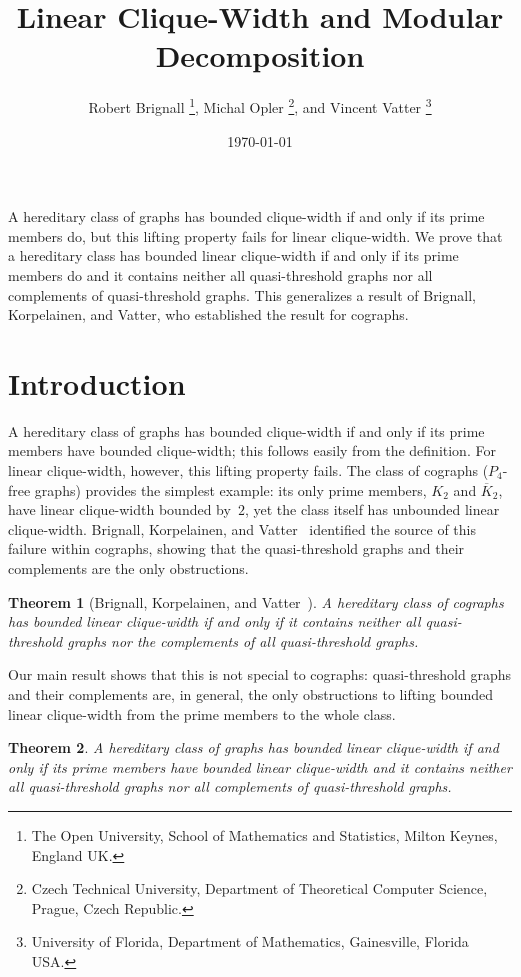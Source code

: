 \documentclass[10pt]{article}
\title{\sc Linear Clique-Width and Modular Decomposition}
\author{
  Robert Brignall%
  \footnote{The Open University, School of Mathematics and Statistics, Milton Keynes, England UK.},
  \quad
  Michal Opler%
  \footnote{Czech Technical University, Department of Theoretical Computer Science, Prague, Czech Republic.},
  \quad
  and
  \quad
  Vincent Vatter%
  \footnote{University of Florida, Department of Mathematics, Gainesville, Florida USA.}
}
\date{\today}
\theoremstyle{plain}
\newtheorem{theorem}{Theorem}[section]
\renewenvironment{abstract}
  {
    \begin{list}{}%
      {\setlength{\rightmargin}{1in}%
       \setlength{\leftmargin}{1in}}%
    \item[]\ignorespaces\begin{small}
  }
  {
    \end{small}\unskip\end{list}
  }
\begin{document}
\maketitle

\begin{abstract}
A hereditary class of graphs has bounded clique-width if and only if its prime members do, but this lifting property fails for linear clique-width. We prove that a hereditary class has bounded linear clique-width if and only if its prime members do and it contains neither all quasi-threshold graphs nor all complements of quasi-threshold graphs. This generalizes a result of Brignall, Korpelainen, and Vatter, who established the result for cographs.
\end{abstract}

\pagestyle{main}

%
%
%
%
%

\section{Introduction}

A hereditary class of graphs has bounded clique-width if and only if its prime members have bounded clique-width; this follows easily from the definition. For linear clique-width, however, this lifting property fails. The class of cographs ($P_4$-free graphs) provides the simplest example: its only prime members, $K_2$ and $\overline{K}_2$, have linear clique-width bounded by~$2$, yet the class itself has unbounded linear clique-width. Brignall, Korpelainen, and Vatter~\cite{brignall:linear-clique-w:} identified the source of this failure within cographs, showing that the quasi-threshold graphs and their complements are the only obstructions.

\begin{theorem}[Brignall, Korpelainen, and Vatter~{\cite[Theorem 1.1]{brignall:linear-clique-w:}}]
\label{thm:bkv}
A hereditary class of cographs has bounded linear clique-width if and only if it contains neither all quasi-threshold graphs nor the complements of all quasi-threshold graphs.
\end{theorem}

Our main result shows that this is not special to cographs: quasi-threshold graphs and their complements are, in general, the only obstructions to lifting bounded linear clique-width from the prime members to the whole class.

\begin{theorem}
\label{thm:primes:bdd:lcw}
A hereditary class of graphs has bounded linear clique-width if and only if its prime members have bounded linear clique-width and it contains neither all quasi-threshold graphs nor all complements of quasi-threshold graphs.
\end{theorem}
\end{document}
